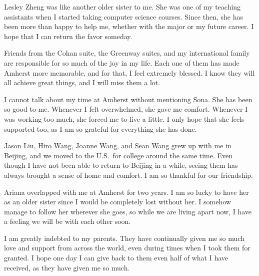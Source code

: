 Lesley Zheng was like another older sister to me. She was one of my teaching
assistants when I started taking computer science courses. Since then, she has
been more than happy to help me, whether with the major or my future career. I
hope that I can return the favor someday.

Friends from the Cohan suite, the Greenway suites, and my international family
are responsible for so much of the joy in my life. Each one of them has made
Amherst more memorable, and for that, I feel extremely blessed. I know they will
all achieve great things, and I will miss them a lot.

I cannot talk about my time at Amherst without mentioning Sona. She has been so
good to me. Whenever I felt overwhelmed, she gave me comfort. Whenever I was
working too much, she forced me to live a little. I only hope that she feels
supported too, as I am so grateful for everything she has done.

Jason Liu, Hiro Wang, Joanne Wang, and Sean Wang grew up with me in Beijing, and
we moved to the U.S.\ for college around the same time. Even though I have not
been able to return to Beijing in a while, seeing them has always brought a
sense of home and comfort. I am so thankful for our friendship.

Ariana overlapped with me at Amherst for two years. I am so lucky to have her as
an older sister since I would be completely lost without her. I somehow manage
to follow her wherever she goes, so while we are living apart now, I have a
feeling we will be with each other soon.

I am greatly indebted to my parents. They have continually given me so much love
and support from across the world, even during times when I took them for
granted. I hope one day I can give back to them even half of what I have
received, as they have given me so much.
